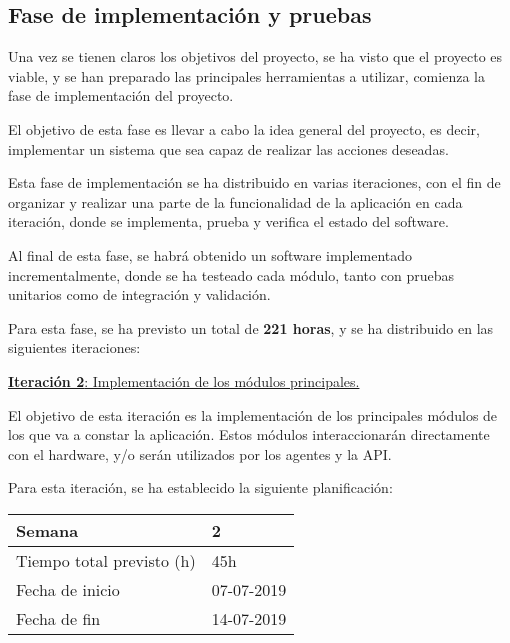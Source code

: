 \subsection{Fase de implementación y pruebas}

Una vez se tienen claros los objetivos del proyecto, se ha visto que el proyecto es viable, y se han preparado las principales herramientas a utilizar, comienza la fase de implementación del proyecto.

El objetivo de esta fase es llevar a cabo la idea general del proyecto, es decir, implementar un sistema que sea capaz de realizar las acciones deseadas.

Esta fase de implementación se ha distribuido en varias iteraciones, con el fin de organizar y realizar una parte de la funcionalidad de la aplicación en cada iteración, donde se implementa, prueba y verifica el estado del software.

Al final de esta fase, se habrá obtenido un software implementado incrementalmente, donde se ha testeado cada módulo, tanto con pruebas unitarios como de integración y validación.

Para esta fase, se ha previsto un total de \textbf{221 horas}, y se ha distribuido en las siguientes iteraciones:

\newpage


\large{\underline{\textbf{Iteración 2}: Implementación de los módulos principales.}}
\vspace{0.3cm}

\normalsize

El objetivo de esta iteración es la implementación de los principales módulos de los que va a constar la aplicación. Estos módulos interaccionarán directamente con el hardware, y/o serán utilizados por los agentes y la API.

Para esta iteración, se ha establecido la siguiente planificación:

\begin{table}[h!]
\centering
\begin{tabular}{|p{5cm}|p{4cm}|}
 \hline
	\cellcolor[gray]{0.9} Semana  & 2\\ \hline
	\cellcolor[gray]{0.9} Tiempo total previsto (h)  & 45h \\ \hline
	\cellcolor[gray]{0.9} Fecha de inicio  & 07-07-2019 \\ \hline
	\cellcolor[gray]{0.9} Fecha de fin  & 14-07-2019 \\ \hline
		
\end{tabular}
\end{table}

